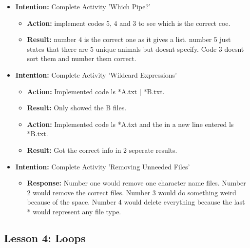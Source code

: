 \documentclass{article}
\begin{document}
\begin{itemize}
\item{\textbf{Intention:} Complete Activity 'Which Pipe?'}

\begin{itemize}
\item{\textbf{Action:} implement codes 5, 4 and 3 to see which is the correct coe.}

\item{\textbf{Result:} number 4 is the correct one as it gives a list. number 5 just states that there are 5 unique animals but doesnt specify. Code 3 doesnt sort them and number them correct.}

\end{itemize}

\item{\textbf{Intention:} Complete Activity 'Wildcard Expressions'}

\begin{itemize}
\item{\textbf{Action:} Implemented code ls *A.txt | *B.txt.}

\item{\textbf{Result:} Only showed the B files.}

\item{\textbf{Action:} Implemented code ls *A.txt and the in a new line entered ls *B.txt.}

\item{\textbf{Result:} Got the correct info in 2 seperate results.}

\end{itemize}

\item{\textbf{Intention:} Complete Activity 'Removing Unneeded Files'}

\begin{itemize}
\item{\textbf{Response:} Number one would remove one character name files. Number 2 would remove the correct files. Number 3 would do something weird because of the space. Number 4 would delete everything because the last * would represent any file type.}


\end{itemize}

\end{itemize}

\subsection{Lesson 4: Loops}
\end{document}
